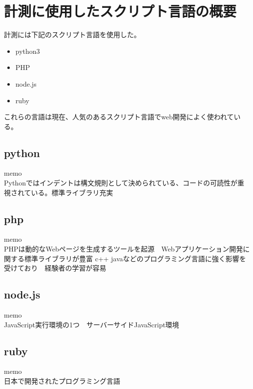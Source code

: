 \chapter{計測に使用したスクリプト言語の概要}
\label{cha:script-language}
計測には下記のスクリプト言語を使用した。
\begin{itemize}
  \item python3
  \item PHP
　\item node.js
  \item ruby
\end{itemize}
これらの言語は現在、人気のあるスクリプト言語でweb開発によく使われている。

\section{python}
memo\\
Pythonではインデントは構文規則として決められている、コードの可読性が重視されている。標準ライブラリ充実
\section{php}
memo\\
PHPは動的なWebページを生成するツールを起源　Webアプリケーション開発に関する標準ライブラリが豊富
c++ javaなどのプログラミング言語に強く影響を受けており　経験者の学習が容易
\section{node.js}
memo\\
JavaScript実行環境の1つ　サーバーサイドJavaScript環境
\section{ruby}
memo\\
日本で開発されたプログラミング言語